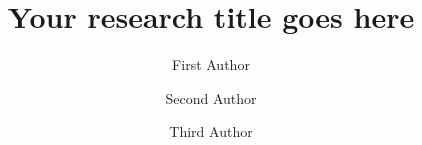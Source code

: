 \title{Your research title goes here}
\author{First Author \and Second Author \and Third Author}

\newcommand{\posterreferences}{%
  [1] Author(s). Title. Venue, year.\par
  [2] Author(s). Title. Venue, year.}

\projectlogostrue %

\newcommand{\ucylogo}{graphics/logo_ucy.png}
\newcommand{\daedaluslogo}{graphics/Daedalus_Research_Centre_flat-wing.pdf}
\newcommand{\dncslogo}{graphics/DNCSgroup.pdf}
\newcommand{\minervalogo}{graphics/MINERVA(project).png}
\newcommand{\erclogo}{graphics/ERC.png}
